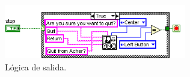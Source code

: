 \begin{itemize}
{\begin{figure}[!htp]
\centering
\includegraphics[width=225pt]{./images/acher_quitcase.png}
\caption{Lógica de salida.}
\label{fig:acher_quitcase}
\end{figure}
}

\end{itemize}